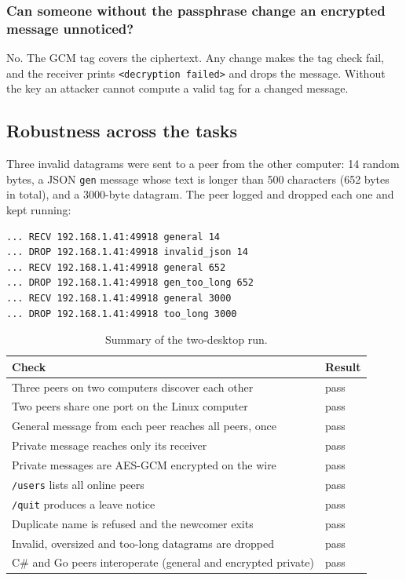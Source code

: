 \documentclass[12pt,a4paper]{article}
\begin{document}
\subsubsection{Can someone without the passphrase change an encrypted message unnoticed?}
No. The GCM tag covers the ciphertext. Any change makes the tag check fail, and the
receiver prints \texttt{<decryption failed>} and drops the message. Without the key
an attacker cannot compute a valid tag for a changed message.

\subsection{Robustness across the tasks}
Three invalid datagrams were sent to a peer from the other computer: 14 random
bytes, a JSON \texttt{gen} message whose text is longer than 500 characters (652
bytes in total), and a 3000-byte datagram. The peer
logged and dropped each one and kept running:

\begin{lstlisting}[style=plain,caption={Invalid input is logged and dropped; the peer keeps running.}]
... RECV 192.168.1.41:49918 general 14
... DROP 192.168.1.41:49918 invalid_json 14
... RECV 192.168.1.41:49918 general 652
... DROP 192.168.1.41:49918 gen_too_long 652
... RECV 192.168.1.41:49918 general 3000
... DROP 192.168.1.41:49918 too_long 3000
\end{lstlisting}

\begin{table}[H]
\centering
\small
\begin{tabularx}{\textwidth}{@{}X l@{}}
\toprule
\textbf{Check} & \textbf{Result} \\
\midrule
Three peers on two computers discover each other & pass \\
Two peers share one port on the Linux computer & pass \\
General message from each peer reaches all peers, once & pass \\
Private message reaches only its receiver & pass \\
Private messages are AES-GCM encrypted on the wire & pass \\
\texttt{/users} lists all online peers & pass \\
\texttt{/quit} produces a leave notice & pass \\
Duplicate name is refused and the newcomer exits & pass \\
Invalid, oversized and too-long datagrams are dropped & pass \\
C\# and Go peers interoperate (general and encrypted private) & pass \\
\bottomrule
\end{tabularx}
\caption{Summary of the two-desktop run.}
\label{tab:checks}
\end{table}
\end{document}
